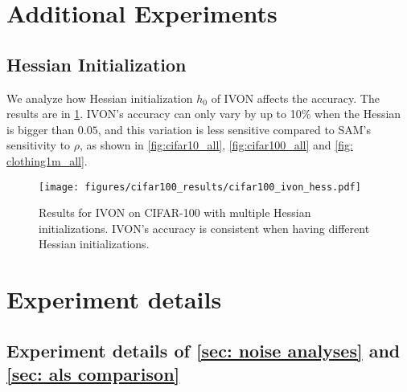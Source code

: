  
 
\section{Additional Experiments} \label{sec: additional exp}
\subsection{Hessian Initialization}

We analyze how Hessian initialization $h_0$ of IVON affects the accuracy. The results are in \cref{fig:cifar100_ivon_hess}. IVON's accuracy can only vary by up to 10\% when the Hessian is bigger than $0.05$, and this variation is less sensitive compared to SAM's sensitivity to $\rho$, as shown in \cref{fig:cifar10_all}, \cref{fig:cifar100_all} and \cref{fig: clothing1m_all}. 

\begin{figure}[h]
    \centering 
    \texttt{[image: figures/cifar100\_results/cifar100\_ivon\_hess.pdf]}
    \caption{Results for IVON on CIFAR-100 with multiple Hessian initializations. IVON's accuracy is consistent when having different Hessian initializations.}
        \label{fig:cifar100_ivon_hess}
\end{figure}


\section{Experiment details} \label{sec: exp details}
\subsection{Experiment details of \cref{sec: noise analyses} and \cref{sec: als comparison}}

